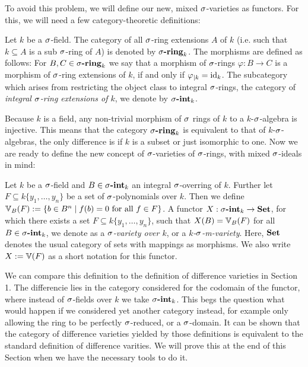 To avoid this problem, we will define our new, mixed $\sigma$-varieties as functors. For this, we will need a few category-theoretic definitions:

\begin{defn}
Let $k$ be a $\sigma$-field. The category of all $\sigma$-ring extensions $A$ of $k$ (i.e. such that $k \subseteq A$ is a sub $\sigma$-ring of $A$) is denoted by $\sringk$. The morphisms are defined as follows: For $B,C \in \sigma\text{{\normalfont\textbf{-ring}}}_k$ we say that a morphism of $\sigma$-rings $\varphi: B \rightarrow C$ is a morphism of $\sigma$-ring extensions of $k$, if and only if $\varphi_{|k} = \text{id}_k$.
The subcategory which arises from restricting the object class to integral $\sigma$-rings, the category of \emph{integral $\sigma$-ring extensions of $k$}, we denote by $\sintk$. \index{$\sintk$} \index{$\sringk$} 
\end{defn}

Because $k$ is a field, any non-trivial morphism of $\sigma$ rings of $k$ to a $k$-$\sigma$-algebra is injective. This means that the category $\sringk$ is equivalent to that of $k$-$\sigma$-algebras, the only difference is if $k$ is a subset or just isomorphic to one. Now we are ready to define the new concept of $\sigma$-varieties of $\sigma$-rings, with mixed $\sigma$-ideals in mind:

\begin{defn}\label{defnVV}
Let $k$ be a $\sigma$-field and $B \in \sigma\text{{\normalfont\textbf{-int}}}_k$ an integral $\sigma$-overring of $k$. Further let $F \subseteq k\{y_1, \ldots, y_n\}$ be a set of $\sigma$-polynomials over $k$. 
Then we define $\mathbb{V}_B(F):= \{ b \in B^n \mid f(b) = 0 \text{ for all } f \in F \}$. A functor $X: \sigma\text{{\normalfont\textbf{-int}}}_k \rightarrow {\normalfont\textbf{Set}}$, for which there exists a set $F \subseteq k\{y_1, \ldots, y_n \}$, such that $X(B) = \mathbb{V}_B(F)$ for all $B \in \sigma\text{{\normalfont\textbf{-int}}}_k$, we denote as a \emph{$\sigma$-variety over $k$}, or a \emph{$k$-$\sigma$-m-variety}.
Here, ${\normalfont\textbf{Set}}$ denotes the usual category of sets with mappings as morphisms. We also write $X := \mathbb{V}(F)$ as a short notation for this functor.   
\end{defn}

We can compare this definition to the definition of difference varieties in Section 1. The differencie lies in the category considered for the codomain of the functor, where instead of $\sigma$-fields over $k$ we take $\sintk$.
This begs the question what would happen if we considered yet another category instead, for example only allowing the ring to be perfectly $\sigma$-reduced, or a $\sigma$-domain. It can be shown that the category of difference varieties
yielded by those definitions is equivalent to the standard definition of difference varities. We will prove this at the end of this Section when we have the necessary tools to do it.


